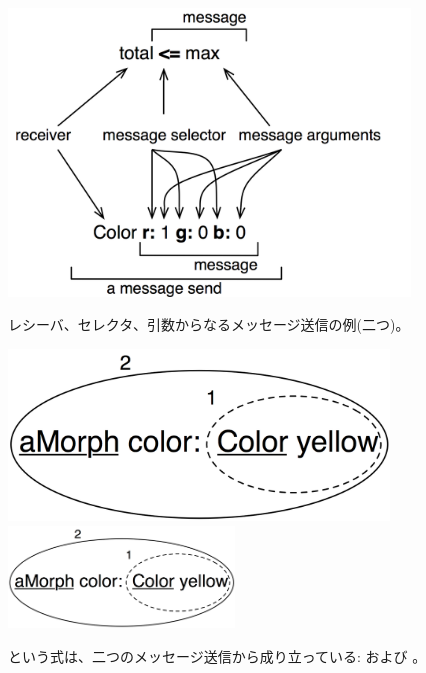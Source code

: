 \documentclass[a4paper,10pt,twoside]{book}
\begin{document}
\begin{figure}[htb]
\begin{minipage}{0.53\textwidth}
	\begin{center}
	\includegraphics[width=0.95\textwidth]{message}
	\caption{レシーバ、セレクタ、引数からなるメッセージ送信の例(二つ)。}\end{center}
\end{minipage}
\hfill
\begin{minipage}{0.43\textwidth}
	\begin{center}
	\ifluluelse
		{\includegraphics[width=0.9\textwidth]{uKeyUnOne}}
		{\includegraphics[width=6cm]{uKeyUnOne}}
	\caption{ という式は、二つのメッセージ送信から成り立っている:  および 。}
	\end{center}
\end{minipage}
\end{figure}
\end{document}
